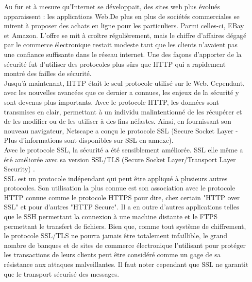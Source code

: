 Au fur et à mesure qu'Internet se développait, des sites web plus évolués apparaissent : les applications Web.De plus en plus de sociétés commerciales se mirent à proposer des achats en ligne pour les particuliers. Parmi celles-ci, EBay et Amazon. L'offre se mit à croître régulièrement, mais le chiffre d'affaires dégagé par le commerce électronique restait modeste tant que les clients n'avaient pas une confiance suffisante dans le réseau internet. Une des façons d'apporter de la sécurité fut d'utiliser des protocoles plus sûrs que HTTP qui a rapidement montré des failles de sécurité.\\
Jusqu’à maintenant, HTTP était le seul protocole utilisé sur le Web. Cependant, avec les  nouvelles avancées que ce dernier a connues, les enjeux de la sécurité y sont devenus plus importants. Avec le protocole HTTP, les données sont transmises en clair, permettant à un individu malintentionné de les récupérer et de les modifier ou de les utiliser à des fins néfastes. Ainsi, en fournissant son nouveau navigateur, Netscape a conçu le protocole SSL (Secure Socket Layer - Plus d'informations sont disponibles sur SSL en annexe). \\
Avec le protocole SSL, la sécurité a été sensiblement améliorée. SSL elle même a été améliorée avec sa version SSL/TLS (Secure Socket Layer/Transport Layer Security) . \\
SSL est un protocole indépendant qui peut être appliqué à plusieurs autres protocoles. Son utilisation la plus connue est son association avec le protocole HTTP connue comme le protocole HTTPS pour dire, chez certain "HTTP over SSL" et pour d’autres "HTTP Secure". Il a en outre d’autres applications telles que le SSH permettant la connexion à une machine distante et le FTPS permettant le transfert de fichiers.
Bien que, comme tout système de chiffrement, le protocole SSL/TLS ne pourra jamais être totalement infaillible, le grand nombre de banques et de sites de commerce électronique l'utilisant pour protéger les transactions de leurs clients peut être considéré comme un gage de sa résistance aux attaques malveillantes. Il faut noter cependant que SSL ne garantit que le transport sécurisé des messages.

